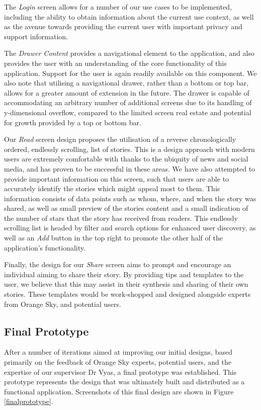 The \emph{Login} screen allows for a number of our use cases to be implemented, including the ability to obtain information about the current use context, as well as the avenue towards providing the current user with important privacy and support information.

The \emph{Drawer Content} provides a navigational element to the application, and also provides the user with an understanding of the core functionality of this application. Support for the user is again readily available on this component. We also note that utilising a navigational drawer, rather than a bottom or top bar, allows for a greater amount of extension in the future. The drawer is capable of accommodating an arbitrary number of additional screens due to its handling of y-dimensional overflow, compared to the limited screen real estate and potential for growth provided by a top or bottom bar.

Our \emph{Read} screen design proposes the utilisation of a reverse chronologically ordered, endlessly scrolling, list of stories. This is a design approach with modern users are extremely comfortable with thanks to the ubiquity of news and social media, and has proven to be successful in these areas. We have also attempted to provide important information on this screen, such that users are able to accurately identify the stories which might appeal most to them. This information consists of data points such as whom, where, and when the story was shared, as well as small preview of the stories content and a small indication of the number of stars that the story has received from readers. This endlessly scrolling list is headed by filter and search options for enhanced user discovery, as well as an \emph{Add} button in the top right to promote the other half of the application's functionality.

Finally, the design for our \emph{Share} screen aims to prompt and encourage an individual aiming to share their story. By providing tips and templates to the user, we believe that this may assist in their synthesis and sharing of their own stories. These templates would be work-shopped and designed alongside experts from Orange Sky, and potential users.

\subsection{Final Prototype}

After a number of iterations aimed at improving our initial designs, based primarily on the feedback of Orange Sky experts, potential users, and the expertise of our supervisor Dr Vyas, a final prototype was established. This prototype represents the design that was ultimately built and distributed as a functional application. Screenshots of this final design are shown in Figure \ref{finalprototype}.

